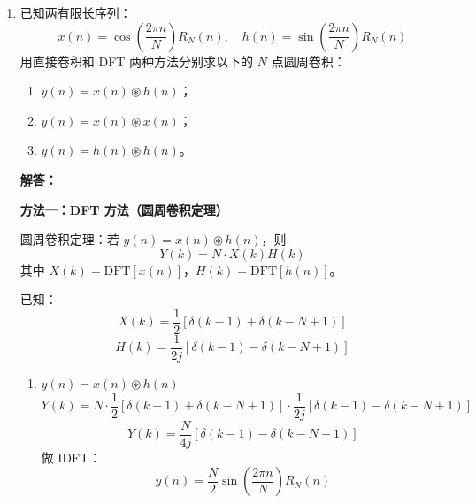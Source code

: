 \begin{enumerate}
\begin{enumerate}
\begin{center}
    \end{center}

    \textbf{计算复杂度分析：}
    直接 $N$ 点 DFT 的计算复杂度为 $\mathbf{O(N^2)}$；
    基‑2 FFT 算法的复杂度为 $\mathbf{O(N\log_2 N)}$。
    当序列长度 $N$ 增大时，直接 DFT 计算量呈平方级快速上升，而 FFT 仅以 $N\log_2 N$ 缓慢增长，长度越大，FFT 运算效率优势越明显。

\end{enumerate}

\vspace{1em}

\item 已知两有限长序列：
\[
x(n) = \cos\left(\frac{2\pi n}{N}\right)R_N(n),\quad h(n) = \sin\left(\frac{2\pi n}{N}\right)R_N(n)
\]
用直接卷积和 DFT 两种方法分别求以下的 $N$ 点圆周卷积：
\begin{enumerate}
    \item $y(n)=x(n)\circledast h(n)$；
    \item $y(n)=x(n)\circledast x(n)$；
    \item $y(n)=h(n)\circledast h(n)$。
\end{enumerate}

\textbf{解答：}

\textbf{方法一：DFT 方法（圆周卷积定理）}

圆周卷积定理：若 $y(n)=x(n)\circledast h(n)$，则
\[
Y(k) = N \cdot X(k)H(k)
\]
其中 $X(k)=\text{DFT}[x(n)]$，$H(k)=\text{DFT}[h(n)]$。

已知：
\[
X(k) = \frac{1}{2}\left[\delta(k-1)+\delta(k-N+1)\right]
\]
\[
H(k) = \frac{1}{2j}\left[\delta(k-1)-\delta(k-N+1)\right]
\]

\begin{enumerate}
    \item $y(n)=x(n)\circledast h(n)$
    \[
    Y(k) = N\cdot \frac{1}{2}\left[\delta(k-1)+\delta(k-N+1)\right] \cdot \frac{1}{2j}\left[\delta(k-1)-\delta(k-N+1)\right]
    \]
    \[
    Y(k) = \frac{N}{4j}\left[\delta(k-1)-\delta(k-N+1)\right]
    \]
    做 IDFT：
    \[
    y(n) = \frac{N}{2}\sin\left(\frac{2\pi n}{N}\right)R_N(n)
    \]


\end{enumerate}
\end{enumerate}
